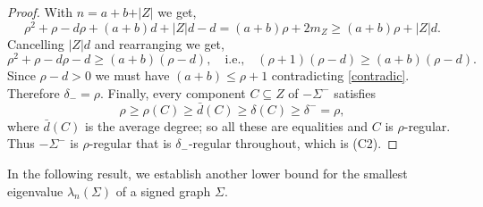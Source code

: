 \documentclass[12pt]{article}
\theoremstyle{plain}
\newtheorem{theorem}{Theorem}[section]
\numberwithin{equation}{section}
\begin{document}
\begin{proof}
		With $n=a+b+\vert Z \vert$ we get,
		\begin{equation*}
			\rho^{2}+\rho-d\rho+(a+b)d+|Z|d-d
			=(a+b)\rho+2m_Z
			\ge (a+b)\rho+|Z|d.
		\end{equation*}
		Cancelling $\vert Z \vert d$ and rearranging we get,
		\begin{equation*}
			\rho^{2}+\rho-d\rho-d
			\ge (a+b)(\rho-d),
			\quad \text{i.e.,} \quad
			(\rho+1)(\rho-d)
			\ge (a+b)(\rho-d).
		\end{equation*}
		Since $\rho -d > 0$ we must have $(a+b) \leq \rho+1$ contradicting \eqref{contradic}. Therefore $\delta_-=\rho$.
		\newline
		Finally, every component $C\subseteq Z$ of $-\Sigma^{-}$ satisfies
		\[
		\rho \ge \rho(C) \ge \bar{d}(C) \ge \delta(C) \ge \delta^{-}=\rho,
		\]
		where $\bar{d}(C)$ is the average degree; so all these are equalities and
		$C$ is $\rho$-regular. Thus $-\Sigma^{-}$ is $\rho$-regular that is $\delta_-$-regular  throughout,
		which is (C2).
	\end{proof}
	
	In the following result, we establish another lower bound for the smallest eigenvalue $\lambda_n(\Sigma)$ of a signed graph $\Sigma$.
	
	
	
	
		
		
\end{document}
